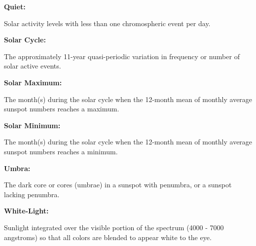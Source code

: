\textbf{Quiet:}
\begin{myindentpar}{1cm}
  Solar activity levels with less than one chromospheric event per day.
\end{myindentpar}

\textbf{Solar Cycle:}
\begin{myindentpar}{1cm}
  The approximately 11-year quasi-periodic variation in frequency or number of solar active events.
\end{myindentpar}

\textbf{Solar Maximum:}
\begin{myindentpar}{1cm}
  The month(s) during the solar cycle when the 12-month mean of monthly average sunspot numbers reaches a maximum.
\end{myindentpar}

\textbf{Solar Minimum:}
\begin{myindentpar}{1cm}
  The month(s) during the solar cycle when the 12-month mean of monthly average sunspot numbers reaches a minimum.
\end{myindentpar}

\textbf{Umbra:}
\begin{myindentpar}{1cm}
  The dark core or cores (umbrae) in a sunspot with penumbra, or a sunspot lacking penumbra.
\end{myindentpar}

\textbf{White-Light:}
\begin{myindentpar}{1cm}
  Sunlight integrated over the visible portion of the spectrum (4000 - 7000 angstroms) so that all colors are blended to appear white to the eye.
\end{myindentpar}

